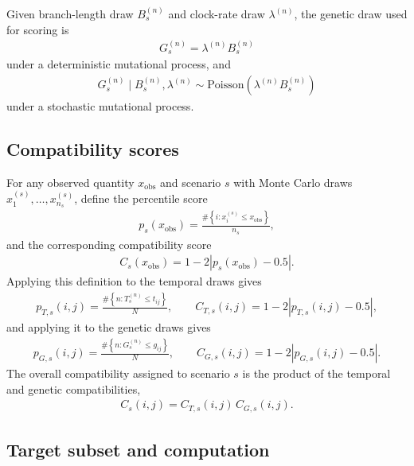 \documentclass[10pt,a4paper]{article}
\begin{document}
Given branch-length draw $B_s^{(n)}$ and clock-rate draw $\lambda^{(n)}$, the genetic draw used for scoring is
\begin{align}
G_s^{(n)} =
\lambda^{(n)} B_s^{(n)}
\end{align}
under a deterministic mutational process, and
\begin{align}
G_s^{(n)} \mid B_s^{(n)}, \lambda^{(n)}
\sim
\mathrm{Poisson}\!\left(\lambda^{(n)} B_s^{(n)}\right)
\end{align}
under a stochastic mutational process.

\subsection*{Compatibility scores}

For any observed quantity $x_{\mathrm{obs}}$ and scenario $s$ with Monte Carlo draws $x_1^{(s)},\ldots,x_{n_s}^{(s)}$, define the percentile score
\begin{align}
p_s(x_{\mathrm{obs}})
=
\frac{\#\left\{i : x_i^{(s)} \le x_{\mathrm{obs}}\right\}}{n_s},
\end{align}
and the corresponding compatibility score
\begin{align}
C_s(x_{\mathrm{obs}})
=
1 - 2\left|p_s(x_{\mathrm{obs}}) - 0.5\right|.
\end{align}
Applying this definition to the temporal draws gives
\begin{align}
p_{T,s}(i,j)
=
\frac{\#\left\{n : T_s^{(n)} \le t_{ij}\right\}}{N},
\qquad
C_{T,s}(i,j)
=
1 - 2\left|p_{T,s}(i,j) - 0.5\right|,
\end{align}
and applying it to the genetic draws gives
\begin{align}
p_{G,s}(i,j)
=
\frac{\#\left\{n : G_s^{(n)} \le g_{ij}\right\}}{N},
\qquad
C_{G,s}(i,j)
=
1 - 2\left|p_{G,s}(i,j) - 0.5\right|.
\end{align}
The overall compatibility assigned to scenario $s$ is the product of the temporal and genetic compatibilities,
\begin{align}
C_s(i,j) = C_{T,s}(i,j)\,C_{G,s}(i,j).
\label{eq:scenario_compatibility}
\end{align}

\subsection*{Target subset and computation}
\end{document}
